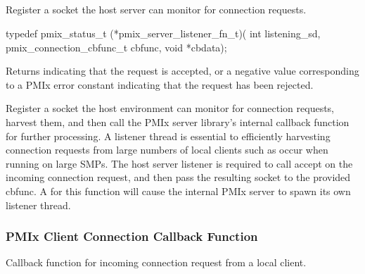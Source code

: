 \subsection{}

\summary

Register a socket the host server can monitor for connection requests.

\format

\cspecificstart
\begin{codepar}
typedef pmix_status_t (*pmix_server_listener_fn_t)(
                             int listening_sd,
                             pmix_connection_cbfunc_t cbfunc,
                             void *cbdata);
\end{codepar}
\cspecificend

\begin{arglist}
\end{arglist}

Returns  indicating that the request is accepted, or a negative value corresponding to a PMIx error constant indicating that the request has been rejected.

\descr

Register a socket the host environment can monitor for connection requests, harvest them, and then call the \ac{PMIx} server library's internal callback function for further processing.
A listener thread is essential to efficiently harvesting connection requests from large numbers of local clients such as occur when running on large SMPs.
The host server listener is required to call accept on the incoming connection request, and then pass the resulting socket to the provided cbfunc.
A  for this function will cause the internal \ac{PMIx} server to spawn its own listener thread.

\subsubsection{PMIx Client Connection Callback Function}

\summary

Callback function for incoming connection request from a local client.

